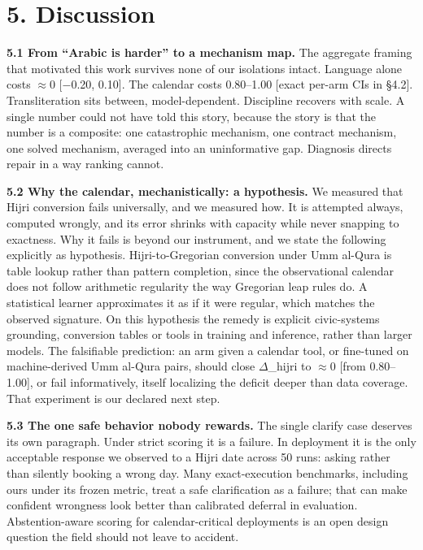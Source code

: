 \documentclass[11pt]{article}
\newcounter{none}
\begin{document}
\section{5. Discussion}\label{discussion}

\textbf{5.1 From ``Arabic is harder'' to a mechanism map.} The aggregate framing that motivated this work survives none of our isolations intact. Language alone costs $\approx$0 {[}$-$0.20, 0.10{]}. The calendar costs 0.80--1.00 {[}exact per-arm CIs in \S{}4.2{]}. Transliteration sits between, model-dependent. Discipline recovers with scale. A single number could not have told this story, because the story is that the number is a composite: one catastrophic mechanism, one contract mechanism, one solved mechanism, averaged into an uninformative gap. Diagnosis directs repair in a way ranking cannot.

\textbf{5.2 Why the calendar, mechanistically: a hypothesis.} We measured that Hijri conversion fails universally, and we measured how. It is attempted always, computed wrongly, and its error shrinks with capacity while never snapping to exactness. Why it fails is beyond our instrument, and we state the following explicitly as hypothesis. Hijri-to-Gregorian conversion under Umm al-Qura is table lookup rather than pattern completion, since the observational calendar does not follow arithmetic regularity the way Gregorian leap rules do. A statistical learner approximates it as if it were regular, which matches the observed signature. On this hypothesis the remedy is explicit civic-systems grounding, conversion tables or tools in training and inference, rather than larger models. The falsifiable prediction: an arm given a calendar tool, or fine-tuned on machine-derived Umm al-Qura pairs, should close $\Delta$\_hijri to $\approx$0 {[}from 0.80--1.00{]}, or fail informatively, itself localizing the deficit deeper than data coverage. That experiment is our declared next step.

\textbf{5.3 The one safe behavior nobody rewards.} The single clarify case deserves its own paragraph. Under strict scoring it is a failure. In deployment it is the only acceptable response we observed to a Hijri date across 50 runs: asking rather than silently booking a wrong day. Many exact-execution benchmarks, including ours under its frozen metric, treat a safe clarification as a failure; that can make confident wrongness look better than calibrated deferral in evaluation. Abstention-aware scoring for calendar-critical deployments is an open design question the field should not leave to accident.
\end{document}
